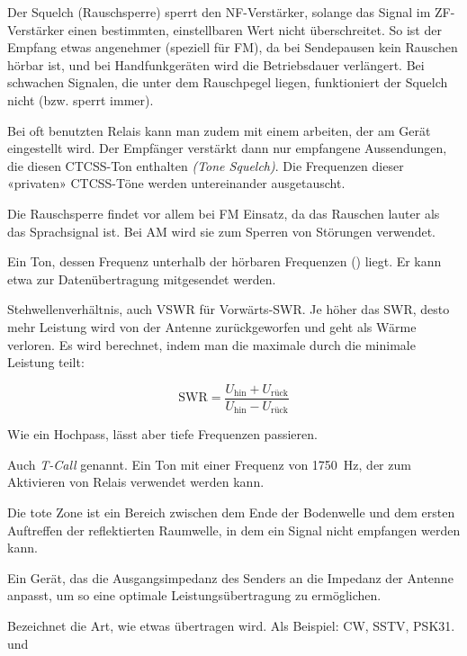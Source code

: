 {Der Squelch (Rauschsperre) sperrt den NF-Verstärker, solange das Signal im ZF-Verstärker einen bestimmten, einstellbaren Wert nicht überschreitet. So ist der Empfang etwas angenehmer (speziell für FM), da bei Sendepausen kein Rauschen hörbar ist, und bei Handfunkgeräten wird die Betriebsdauer verlängert. Bei schwachen Signalen, die unter dem Rauschpegel liegen, funktioniert der Squelch nicht (bzw. sperrt immer).

Bei oft benutzten Relais kann man zudem mit einem  arbeiten, der am Gerät eingestellt wird. Der Empfänger verstärkt dann nur empfangene Aussendungen, die diesen CTCSS-Ton enthalten \textit{(Tone Squelch)}. Die Frequenzen dieser «privaten» CTCSS-Töne werden untereinander ausgetauscht.

Die Rauschsperre findet vor allem bei FM Einsatz, da das Rauschen lauter als das Sprachsignal ist. Bei AM wird sie zum Sperren von Störungen verwendet.}

{}

{Ein Ton, dessen Frequenz unterhalb der hörbaren Frequenzen () liegt. Er kann etwa zur Datenübertragung mitgesendet werden.}

{Stehwellenverhältnis, auch VSWR für Vorwärts-SWR. Je höher das SWR, desto mehr Leistung wird von der Antenne zurückgeworfen und geht als Wärme verloren. Es wird berechnet, indem man die maximale durch die minimale Leistung teilt:

\[\mathrm{SWR} = \frac{U_\mathrm{hin} + U_\mathrm{rück}}{U_\mathrm{hin}-U_\mathrm{rück}}\]
}

{Wie ein Hochpass, lässt aber tiefe Frequenzen passieren. }

{Auch \textit{T-Call} genannt. Ein Ton mit einer Frequenz von 1750 Hz, der zum Aktivieren von Relais verwendet werden kann.}

{Die tote Zone ist ein Bereich zwischen dem Ende der Bodenwelle und dem ersten Auftreffen der reflektierten Raumwelle, in dem ein Signal nicht empfangen werden kann.}

{Ein Gerät, das die Ausgangsimpedanz des Senders an die Impedanz der Antenne anpasst, um so eine optimale Leistungsübertragung zu ermöglichen.}

{Bezeichnet die Art, wie etwas übertragen wird. Als Beispiel: CW, SSTV, PSK31.  und }

